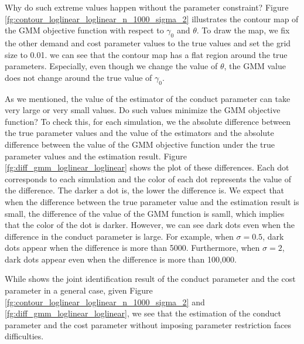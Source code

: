 \documentclass[11pt, a4paper]{article}
\begin{document}


Why do such extreme values happen without the parameter constraint?
Figure \ref{fg:contour_loglinear_loglinear_n_1000_sigma_2} illustrates the contour map of the GMM objective function  with respect to $\gamma_0$ and $\theta$.
To draw the map, we fix the other demand and cost parameter values to the true values and set the grid size to 0.01.
we can see that the contour map has a flat region around the true parameters.
Especially, even though we change the value of $\theta$, the GMM value does not change around the true value of $\gamma_0$.

As we mentioned, the value of the estimator of the conduct parameter can take very large or very small values.
Do such values minimize the GMM objective function?
To check this, for each simulation, we the absolute difference between the true parameter values and the value of the estimators and the absolute difference between the value of the GMM objective function under the true parameter values and the estimation result.
Figure \ref{fg:diff_gmm_loglinear_loglinear} shows the plot of these differences. 
Each dot corresponds to each simulation and the color of each dot represents the value of the difference. 
The darker a dot is, the lower the difference is.
We expect that when the difference between the true parameter value and the estimation result is small, the difference of the value of the GMM function is samll, which implies that the color of the dot is darker. 
However, we can see dark dots even when the difference in the conduct parameter is large.
For example, when $\sigma = 0.5$, dark dots appear when the difference is more than 5000.
Furthermore, when $\sigma = 2$, dark dots appear even when the difference is more than 100,000.

While \citet{lau1982identifying} shows the joint identification result of the conduct parameter and the cost parameter in a general case, given Figure \ref{fg:contour_loglinear_loglinear_n_1000_sigma_2} and \ref{fg:diff_gmm_loglinear_loglinear}, we see that the estimation of the conduct parameter and the cost parameter without imposing parameter restriction faces difficulties.
\end{document}
